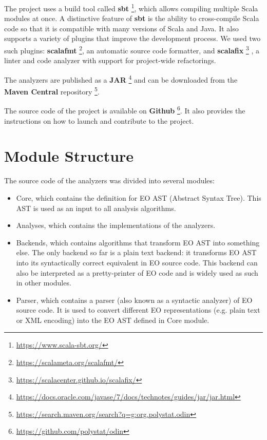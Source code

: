 The project uses a build tool called \textbf{sbt} \footnote{\url{https://www.scala-sbt.org/}}, which allows compiling multiple Scala modules at once. A distinctive feature of \textbf{sbt} is the ability to cross-compile Scala code so that it is compatible with many versions of Scala and Java. It also supports a variety of plugins that improve the development process. We used two such plugins: \textbf{scalafmt} \footnote{\url{https://scalameta.org/scalafmt/}}, an automatic source code formatter, and \textbf{scalafix} \footnote{\url{https://scalacenter.github.io/scalafix/}} , a linter and code analyzer with support for project-wide refactorings.

The analyzers are published as a \textbf{JAR} \footnote{\url{https://docs.oracle.com/javase/7/docs/technotes/guides/jar/jar.html}} and can be downloaded from the \textbf{Maven Central} repository \footnote{\url{https://search.maven.org/search?q=g:org.polystat.odin}}.

The source code of the project is available on \textbf{Github} \footnote{\url{https://github.com/polystat/odin}}. It also provides the instructions on how to launch and contribute to the project.


\section{Module Structure}
\label{met:module_structure}
The source code of the analyzers was divided into several modules:
\begin{itemize}
    \item Core, which contains the definition for EO AST (Abstract Syntax Tree).
          This AST is used as an input to all analysis algorithms.
    \item Analyses, which contains the implementations of the analyzers.
    \item Backends, which contains algorithms that transform EO AST into something else. The only backend so far is a plain text backend: it transforms EO AST into its syntactically correct equivalent in EO source code. This backend can also be interpreted as a pretty-printer of EO code and is widely used as such in other modules.
    \item Parser, which contains a parser (also known as a syntactic analyzer) of EO source code. It is used to convert different EO representations (e.g. plain text or XML encoding) into the EO AST defined in Core module.
\end{itemize}
